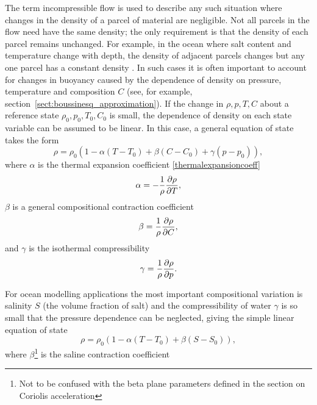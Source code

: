 The term incompressible flow is used to describe any such situation where
changes in the density of a parcel of material are negligible.  Not all
parcels in the flow need have the same density; the only requirement is that
the density of each parcel remains unchanged.  For example, in the ocean
where salt content and temperature change with depth, the density of
adjacent parcels changes but any one parcel has a constant density
\cite{panton2006}.  In such cases it is often important to account for
changes in buoyancy caused by the dependence of density on pressure,
temperature and composition $C$ (see, for example,
section~\ref{sect:boussinesq_approximation}).  If the change in $\rho,p,T,C$
about a reference state $\rho_0,p_0,T_0,C_0$ is small, the dependence of
density on each state variable can be assumed to be linear.  In this case, a
general equation of state takes the form
\begin{equation}
\rho = \rho_0(1 - \alpha(T-T_0) + \beta(C-C_0) + \gamma(p-p_0)),
\end{equation}
where $\alpha$ is the thermal expansion coefficient \eqref{thermalexpansioncoeff}
\begin{equation*}
\alpha = -\frac{1}{\rho}\frac{\partial\rho}{\partial T},
\end{equation*}
$\beta$ is a general compositional contraction coefficient
\begin{equation}
\beta = \frac{1}{\rho}\frac{\partial\rho}{\partial C},
\end{equation}
and $\gamma$ is the isothermal compressibility
\begin{equation}
\gamma = \frac{1}{\rho}\frac{\partial\rho}{\partial p}.
\end{equation}

For ocean modelling applications the most important compositional variation is salinity $S$ (the volume fraction of salt) and the compressibility of water $\gamma$ is so small that the pressure dependence can be neglected, giving the simple linear equation of state
\begin{equation}
\rho = \rho_0(1 - \alpha(T-T_0) + \beta(S-S_0)),
\end{equation}
where $\beta$\footnote{Not to be confused with the beta plane parameters defined in the section on Coriolis acceleration} is the saline contraction coefficient


